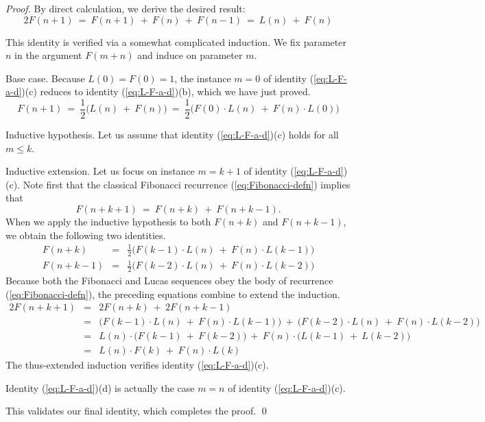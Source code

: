 \begin{proof}
By direct calculation, we derive the desired result:
\[ 2 F(n+1) \ = \ F(n+1) \ + \ F(n) \ + \ F(n-1) \ = \ L(n) \ + \ F(n)  \]

\bigskip

This identity is verified via a somewhat complicated induction.  We fix parameter $n$ in the argument $F(m+n)$ and induce on parameter $m$.

\medskip

\noindent
{\sf Base case.}
Because $L(0) = F(0)= 1$, the instance $m=0$ of identity (\ref{eq:L-F-a-d})(c) reduces to identity (\ref{eq:L-F-a-d})(b), which we have just proved.
\[ F(n+1) \ = \ \frac{1}{2} \big( L(n) \ + \ F(n) \big)
\ = \ \frac{1}{2} \big( F(0) \cdot L(n) \ + \ F(n) \cdot L(0) \big)
\]

\medskip 

\noindent
{\sf Inductive hypothesis}.
Let us assume that identity (\ref{eq:L-F-a-d})(c) holds for all $m \leq k$.

\medskip

\noindent
{\sf Inductive extension}.
Let us focus on instance $m = k+1$ of identity (\ref{eq:L-F-a-d})(c).  Note first that the classical Fibonacci recurrence (\ref{eq:Fibonacci-defn}) implies that
\[ F(n + k +1) \ = \ F(n + k) \ + \ F(n + k - 1). \]
When we apply the inductive hypothesis to both $F(n + k)$ and $F(n + k - 1)$, we obtain the following two identities.
\begin{eqnarray*}
F(n + k) & = & \frac{1}{2} \big( F(k-1) \cdot L(n) \ + \ F(n) \cdot L(k-1) \big) \\
F(n + k - 1) & = & \frac{1}{2} \big( F(k-2) \cdot L(n) \ + \ F(n) \cdot L(k-2) \big)
\end{eqnarray*}
Because both the Fibonacci and Lucas sequences obey the body of recurrence (\ref{eq:Fibonacci-defn}), the preceding equations combine to extend the induction.
\begin{eqnarray*}
2 F(n + k +1) & = & 2 F(n + k) \ + \ 2 F(n + k - 1) \\
              & = & 
\big( F(k-1) \cdot L(n) \ + \ F(n) \cdot L(k-1) \big)
\ + \
\big( F(k-2) \cdot L(n) \ + \ F(n) \cdot L(k-2) \big) \\
              & = &
L(n) \cdot \big( F(k-1) \ + \ F(k-2) \big)
\ + \
F(n) \cdot \big( L(k-1) \ + \ L(k-2) \big) \\
              & = &
L(n) \cdot F(k) \ + \ F(n) \cdot L(k)
\end{eqnarray*}
The thus-extended induction verifies identity (\ref{eq:L-F-a-d})(c).

\bigskip

Identity (\ref{eq:L-F-a-d})(d) is actually the case $m=n$ of identity (\ref{eq:L-F-a-d})(c).

\smallskip

This validates our final identity, which completes the proof.  \qed
\end{proof}

